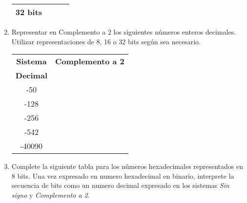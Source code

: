 \documentclass[12pt]{article}
\begin{document}
\begin{enumerate}
\begin{center}
\begin{tabular}[t]{|c|c|c|c|}
            \hline

            32 bits&&&\\

            \hline

            \end{tabular}

        \end{center}


    \item Representar en Complemento a 2 los siguientes números enteros
        decimales. Utilizar representaciones de 8, 16 o 32 bits según sea
        necesario.

        \begin{center}

            \begin{tabular}[t]{|c|c|}

            \hline

                \textbf{Sistema} & \textbf{Complemento a 2}\\

                \textbf{Decimal} & ~ \\

            \hline

                -50 & \hspace{27em}~ \\

            \hline

                -128&\\

            \hline

                -256&\\

            \hline

                -542&\\

            \hline

                -40090&\\

            \hline

            \end{tabular}

        \end{center}

    \pagebreak %
    \item Complete la siguiente tabla para los números hexadecimales
        representados en 8 bits. Una vez expresado en numero hexadecimal en
        binario, interprete la secuencia de bits como un numero decimal
        expresado en los sistemas \emph{Sin signo} y \emph{Complemento a 2}.


\end{enumerate}
\end{document}
